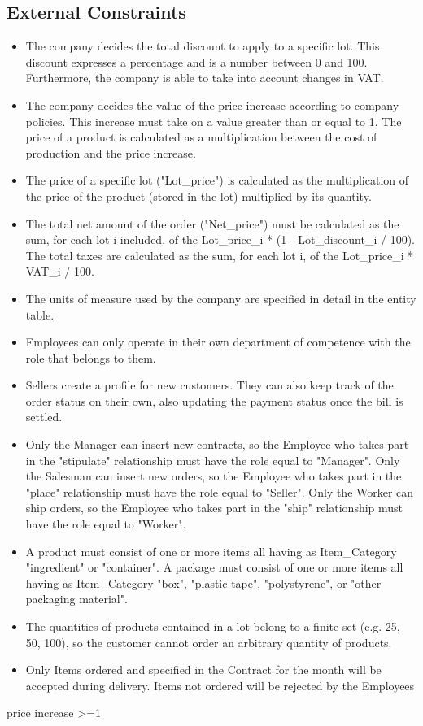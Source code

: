 \subsection{External Constraints}
\begin{itemize}
\item The company decides the total discount to apply to a specific lot. This discount expresses a percentage and is a number between 0 and 100. Furthermore, the company is able to take into account changes in VAT.
\item The company decides the value of the price increase according to company policies. This increase must take on a value greater than or equal to 1. The price of a product is calculated as a multiplication between the cost of production and the price increase.
\item The price of a specific lot ("Lot_price") is calculated as the multiplication of the price of the product (stored in the lot) multiplied by its quantity.
\item The total net amount of the order ("Net_price") must be calculated as the sum, for each lot i included, of the Lot\_price\_i * (1 - Lot\_discount\_i / 100). The total taxes are calculated as the sum, for each lot i, of the Lot\_price\_i * VAT\_i / 100.
\item The units of measure used by the company are specified in detail in the entity table.
\item Employees can only operate in their own department of competence with the role that belongs to them.
\item Sellers create a profile for new customers. They can also keep track of the order status on their own, also updating the payment status once the bill is settled.
\item Only the Manager can insert new contracts, so the Employee who takes part in the "stipulate" relationship must have the role equal to "Manager". Only the Salesman can insert new orders, so the Employee who takes part in the "place" relationship must have the role equal to "Seller". Only the Worker can ship orders, so the Employee who takes part in the "ship" relationship must have the role equal to "Worker".
\item A product must consist of one or more items all having as Item\_Category "ingredient" or "container". A package must consist of one or more items all having as Item\_Category "box", "plastic tape", "polystyrene", or "other packaging material". %
\item The quantities of products contained in a lot belong to a finite set (e.g. 25, 50, 100), so the customer cannot order an arbitrary quantity of products.
\item Only Items ordered and specified in the Contract for the month will be accepted during delivery. Items not ordered will be rejected by the Employees
\end{itemize}

price increase >=1